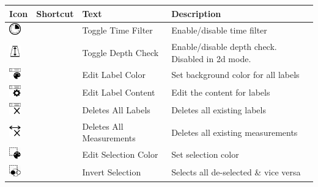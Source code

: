 \begin{table}[H]
  \center
  \begin{tabular}{ | l | l | l | l |}
    \hline
    \textbf{Icon} & \textbf{Shortcut} &\textbf{Text} &  \textbf{Description} \\ \hline
    \includegraphics[width=0.5cm,frame]{../../data/icons/time.png} & & Toggle Time Filter & Enable/disable time filter \\ \hline
    \includegraphics[width=0.5cm,frame]{../../data/icons/depth.png} & & Toggle Depth Check & Enable/disable depth check. Disabled in 2d mode. \\ \hline
    \includegraphics[width=0.5cm,frame]{../../data/icons/label_color.png} & & Edit Label Color & Set background color for all labels \\ \hline
    \includegraphics[width=0.5cm,frame]{../../data/icons/label_edit.png} & & Edit Label Content & Edit the content for labels \\ \hline
    \includegraphics[width=0.5cm,frame]{../../data/icons/label_delete.png} & & Deletes All Labels & Deletes all existing labels \\ \hline
    \includegraphics[width=0.5cm,frame]{../../data/icons/measurement_delete.png} & & Deletes All Measurements & Deletes all existing measurements \\ \hline 
    \includegraphics[width=0.5cm,frame]{../../data/icons/select_color.png} & & Edit Selection Color & Set selection color \\ \hline
    \includegraphics[width=0.5cm,frame]{../../data/icons/select_invert.png} & & Invert Selection & Selects all de-selected \& vice versa \\ \hline

\end{tabular}
\end{table}
